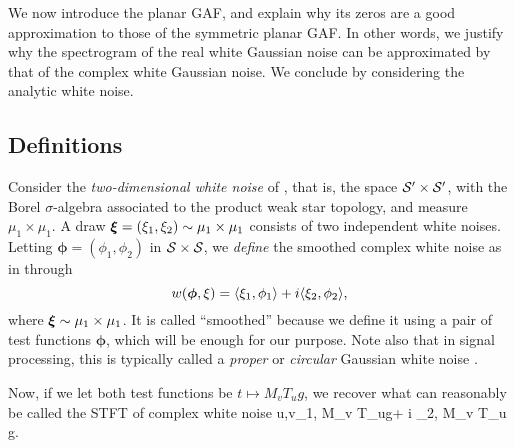 We now introduce the planar GAF, and explain why its zeros are a
good approximation to those of the symmetric planar GAF. In other words, we
justify why the spectrogram of the real white Gaussian noise can be approximated
by that of the complex white Gaussian noise. We conclude by
considering the analytic white noise. 

\subsection{Definitions}
\label{s:complexWhiteNoise}
Consider the \emph{two-dimensional white noise} of \cite[Section
2.1.2]{HOUZ10}, that is, the space $\mathcal{S}'\times
\mathcal{S}'$, with the Borel $\sigma$-algebra associated to the product weak star topology, and measure
$\mu_1\times\mu_1$. A draw ${\boldsymbol{\xi}}=(\xi_1,\xi_2)\sim\mu_1\times\mu_1$
consists of two independent white noises. Letting
$\boldsymbol{\phi}=(\phi_1,\phi_2)$ in
$\mathcal{S}\times \mathcal{S}$, we \emph{define} the smoothed complex
white noise as in \cite[Exercise 2.26]{HOUZ10} through 
$$ 
w(\boldsymbol{\phi},\xi) =  \langle\xi_1, \phi_1\rangle + i \langle\xi_2, \phi_2\rangle, 
$$
where ${\boldsymbol{\xi}}\sim\mu_1\times\mu_1 $. It is called ``smoothed'' because we define
it using a pair of test functions $\boldsymbol{\phi}$, which will be enough for
our purpose. Note also that in signal processing, this is typically called a
\emph{proper} or \emph{circular} Gaussian white noise \citep{PiBo97}.

Now, if we let both test functions be $t\mapsto M_v T_u g$, we recover what can
reasonably be called the STFT of complex white noise 
\beq
u,v\mapsto \langle\fomega_1, M_v T_ug\rangle + i \langle\fomega_2, M_v T_u
g\rangle.
\label{e:complexSTFT}
\eeq
